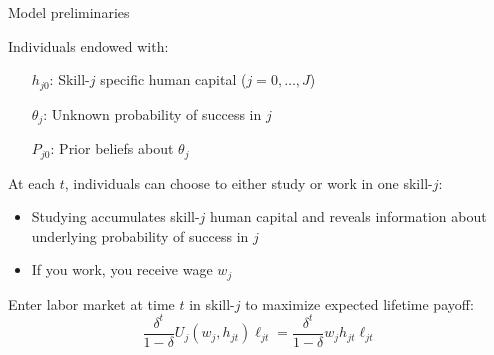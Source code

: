 
\begin{frame}{Model preliminaries}




% 

Individuals endowed with:
\begin{itemize}
    \item [$h_{j0}$:] Skill-$j$ specific human capital ($j=0,\dots,J$)
    \item [$\theta_j$:] Unknown probability of success in $j$
    \item [$P_{j0}$:] Prior beliefs about $\theta_j$
\end{itemize}

\vspace{2ex}
At each $t$, individuals can choose to either study or work in one skill-$j$:
\begin{itemize}
    \item Studying accumulates skill-$j$ human capital and reveals information about underlying probability of success in $j$
    \item If you work, you receive wage $w_j$
\end{itemize}

\vspace{2ex}
Enter labor market at time $t$ in skill-$j$ to maximize expected lifetime payoff:
\begin{equation*}
    \frac{\delta^t}{1 - \delta} U_j (w_{j}, h_{jt}) \ell_{jt}
    = \frac{\delta^t}{1 - \delta} w_{j} h_{jt} \ell_{jt}
\end{equation*}


\end{frame}

